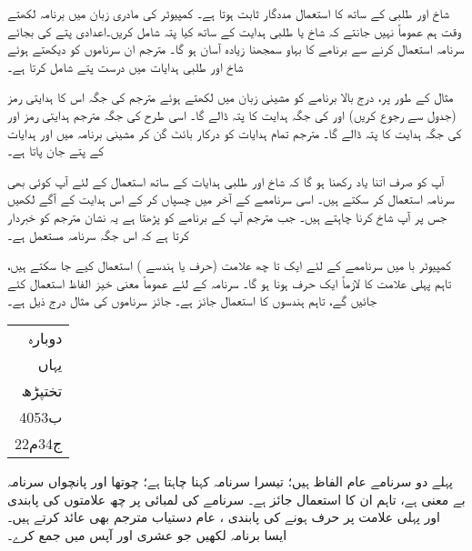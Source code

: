 شاخ اور طلبی  کے ساتھ کا استعمال مددگار ثابت ہوتا ہے۔ کمپیوٹر کی مادری زبان میں برنامہ لکھتے وقت  ہم عموماً نہیں جانتے کہ شاخ یا طلبی ہدایت کے ساتھ کیا پتہ شامل کریں۔اعدادی پتے کی بجائے سرنامہ استعمال کرنے سے  برنامے کا بہاو  سمجھنا  زیادہ  آسان ہو گا۔ مترجم ان سرناموں  کو دیکھتے ہوئے شاخ اور طلبی  ہدایات میں  درست پتے شامل کرتا ہے۔

مثال کے طور پر، درج بالا برنامے کو مشینی زبان میں  لکھتے ہوئے مترجم  \sJZ کی جگہ اس کا ہدایتی رمز   (جدول  سے رجوع کریں)  اور    کی جگہ \sHLT ہدایت کا پتہ ڈالے گا۔ اسی طرح \sJMP کی جگہ مترجم  ہدایتی رمز    اور    کی جگہ   ہدایت \DCR{\regC} کا پتہ ڈالے گا۔ مترجم تمام ہدایات کو درکار بائٹ گن کر    مشینی برنامہ میں   \sHLT اور \sJMP ہدایات کے پتے جان پاتا ہے۔

آپ کو صرف اتنا یاد رکھنا ہو گا کہ شاخ اور طلبی ہدایات کے ساتھ استعمال کے لئے  آپ کوئی بھی  سرنامہ  استعمال کر سکتے ہیں۔ اسی  سرناممے کے آخر میں   چسپاں کر کے  اس ہدایت کے آگے لکھیں جس پر آپ شاخ کرنا  چاہتے ہیں۔ جب مترجم آپ کے برنامے کو پڑھتا ہے یہ نشان  مترجم کو خبردار کرتا ہے کہ اس جگہ سرنامہ مستعمل ہے۔

کمپیوٹر با میں  سرناممے کے لئے ایک  تا  چھ    علامت (حرف یا ہندسے ) استعمال کیے جا سکتے ہیں، تاہم پہلی علامت کا  لازماً ایک  حرف  ہونا ہو گا۔ سرنامہ کے  لئے  عموماً معنی خیز الفاظ استعمال کئے جائیں گے،  تاہم ہندسوں کا استعمال جائز ہے۔ جائز سرناموں کی مثال درج ذیل ہے۔
 \begin{center}
\begin{tabular}{r}
دوبارہ\\ 
یہاں\\
تختپڑھ\\
ب4053\\
ج34م22 
\end{tabular}
\end{center}
پہلے دو سرنامے عام الفاظ ہیں؛ تیسرا سرنامہ     کہنا چاہتا ہے؛ چوتھا اور پانچواں  سرنامہ بے معنی   ہے، تاہم ان کا استعمال جائز ہے۔ سرنامے کی لمبائی پر چھ علامتوں کی  پابندی اور پہلی علامت    پر  حرف ہونے کی   پابندی  ، عام  دستیاب مترجم    بھی عائد کرتے ہیں۔
ایسا برنامہ لکھیں جو عشری  اور  آپس میں جمع کرے۔

